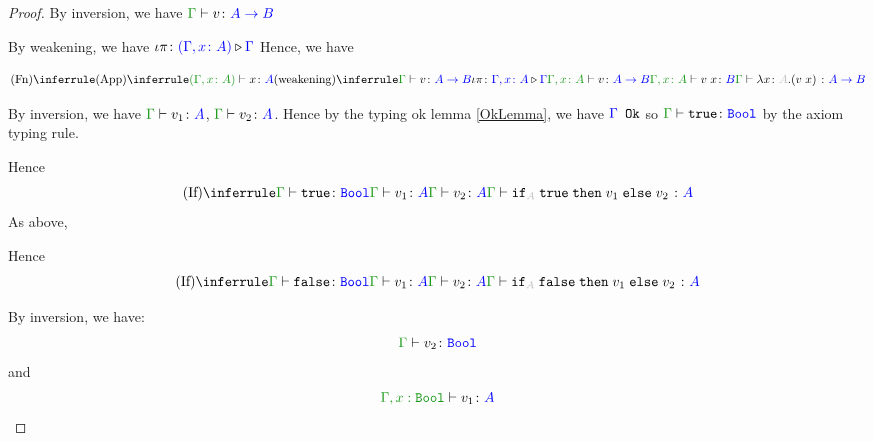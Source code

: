 \documentclass{report}
\begin{document}
\begin{framed}
\begin{proof}
            By inversion, we have $\gtyperelation{v}{\ab}$
        
            By weakening, we have $\iota\pi \colon {\color{blue}(\Gamma, x\colon A)} \triangleright {\color {blue} \Gamma}$
            Hence, we have
        
            \begin{equation}
                \ntreeruleI{Fn}{
                    \ntreeruleII{App}{
                        \typerelation{(\gax)}{x}{A}
                    }{
                        \ntreeruleII{weakening}{
                            \gtyperelation{v}{\ab}
                        }{
                            \wrel{\i\pi}{\gax}{\G}
                        }{
                            \typerelation{\gax}{v}{\ab}
                        }
                    } {
                        \typerelation{\gax}{\apply{v}{x}}{B}
                    }
                }{\gtyperelation{\lam{x}{A}{(\apply{v}{x})}}{\ab}}
            \end{equation}
        
                By inversion, we have $\gtyperelation{v_1}{ A}$, $\gtyperelation{v_2}{ A}$. Hence by the typing ok lemma \ref{OkLemma}, we have ${\color{blue} \Gamma} \texttt{ Ok}$ so $\gtyperelation{\t}{\B}$ by the axiom typing rule.
        
                Hence 
                \begin{equation}
                        \ntreeruleIII{If}{
                            \gtyperelation{\t}{\B}
                        }{
                            \gtyperelation{v_1}{ A}
                        }{
                            \gtyperelation{v_2}{ A}
                        }{
                            \gtyperelation{\pifthenelse{A}{\t}{v_1}{v_2}}{ A}
                        }
                \end{equation}
            As above,
        
            Hence 
            \begin{equation}
                \ntreeruleIII{If}{
                    \gtyperelation{\f}{\B}
                }{
                    \gtyperelation{v_1}{ A}
                }{
                    \gtyperelation{v_2}{ A}
                }{
                    \gtyperelation{\pifthenelse{A}{\f}{v_1}{v_2}}{ A}
                }
        \end{equation}
        
            By inversion, we have:
            \begin{equation}
                \gtyperelation{v_2}{\B}
            \end{equation}
            and
            \begin{equation}
                \typerelation{\G, x:\B}{v_1}{ A}
            \end{equation}
            

\end{proof}
\end{framed}
\end{document}
